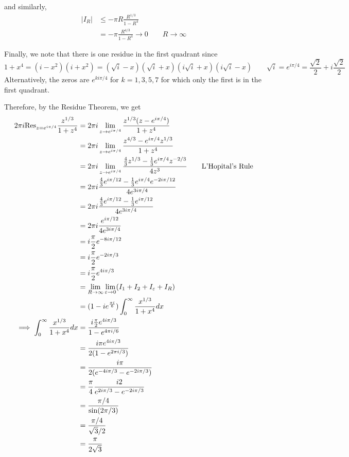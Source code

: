 \documentclass[12pt]{Qual}
\begin{document}
\begin{solution}
and similarly, \begin{align*}
    |I_R|&\le-\pi R\frac{R^{1/3}}{1-R^4}\\
    &=-\pi\frac{R^{4/3}}{1-R^4}\to0\qquad R\to\infty
\end{align*}

Finally, we note that there is one residue in the first quadrant since $$1+x^4=(i-x^2)(i+x^2)=(\sqrt{i}-x)(\sqrt{i}+x)(i\sqrt{i}+x)(i\sqrt{i}-x)\qquad\sqrt{i}=e^{i\pi/4}=\frac{\sqrt{2}}{2}+i\frac{\sqrt{2}}{2}$$ Alternatively, the zeros are $e^{ki\pi/4}$ for $k=1,3,5,7$ for which only the first is in the first quadrant.

Therefore, by the Residue Theorem, we get \begin{align*}
    2\pi i\text{Res}_{z=e^{i\pi/4}}\frac{z^{1/3}}{1+z^4}&=2\pi i\lim_{z\to e^{i\pi/4}}\frac{z^{1/3}(z-e^{i\pi/4})}{1+z^4}\\
    &=2\pi i\lim_{z\to e^{i\pi/4}}\frac{z^{4/3}-e^{i\pi/4}z^{1/3}}{1+z^4}\\
    &=2\pi i\lim_{z\to e^{i\pi/4}}\frac{\frac{4}{3}z^{1/3}-\frac{1}{3}e^{i\pi/4}z^{-2/3}}{4z^3}\qquad\text{L'Hopital's Rule}\\
    &=2\pi i\frac{\frac{4}{3}e^{i\pi/12}-\frac{1}{3}e^{i\pi/4}e^{-2i\pi/12}}{4e^{3i\pi/4}}\\
    &=2\pi i\frac{\frac{4}{3}e^{i\pi/12}-\frac{1}{3}e^{i\pi/12}}{4e^{3i\pi/4}}\\
    &=2\pi i\frac{e^{i\pi/12}}{4e^{3i\pi/4}}\\
    &=i\frac{\pi}{2}e^{-8i\pi /12}\\
    &=i\frac{\pi}{2}e^{-2i\pi /3}\\
    &=i\frac{\pi}{2}e^{4i\pi /3}\\
    &=\lim_{R\to\infty}\lim_{\varepsilon\to0}(I_1+I_2+I_\varepsilon+I_R)\\
    &=(1-ie^{\frac{\pi i}{6}})\int_0^\infty\frac{x^{1/3}}{1+x^4}dx\\
    \implies \int_0^\infty\frac{x^{1/3}}{1+x^4}dx&=\frac{i\frac{\pi}{2}e^{4i\pi /3}}{1-e^{4\pi i/6}}\\
    &=\frac{i\pi e^{4i\pi /3}}{2(1-e^{2\pi i/3})}\\
    &=\frac{i\pi}{2(e^{-4i\pi/3}-e^{-2i\pi/3})}\\
    &=\frac{\pi}{4}\frac{i2}{e^{2i\pi/3}-e^{-2i\pi/3}}\\
    &=\frac{\pi/4}{\sin(2\pi/3)}\\
    &=\frac{\pi/4}{\sqrt{3}/2}\\
    &=\frac{\pi}{2\sqrt{3}}
\end{align*}

\end{solution}
\newpage
\end{document}
